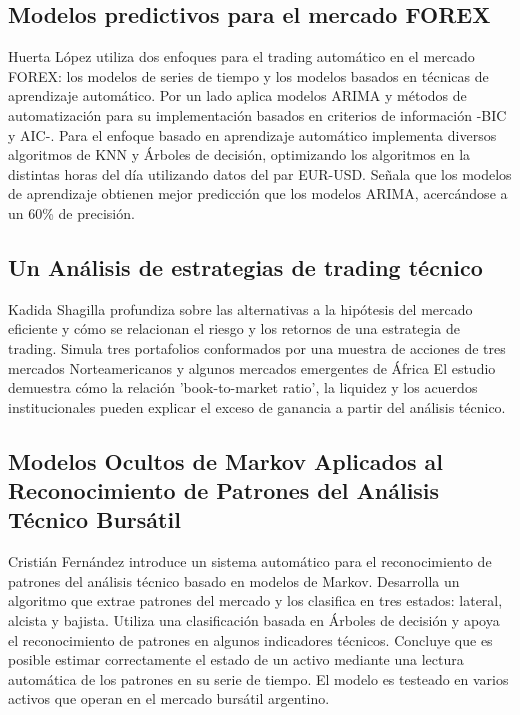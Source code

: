 \documentclass[a4paper,12pt]{Latex/Classes/PhDthesisPSnPDF}
\begin{document}
\subsection{Modelos predictivos para el mercado FOREX}

Huerta López utiliza dos enfoques para el trading automático en el mercado FOREX: los modelos de series de tiempo y los modelos basados en técnicas de aprendizaje automático. Por un lado aplica modelos ARIMA y métodos de automatización para su implementación basados en criterios de información -BIC y AIC-. Para el enfoque basado en aprendizaje automático implementa diversos algoritmos de KNN y Árboles de decisión, optimizando los algoritmos en la distintas horas del día utilizando datos del par EUR-USD. Señala que los modelos de aprendizaje obtienen mejor predicción que los modelos ARIMA, acercándose a un 60\% de precisión.

\subsection{Un Análisis de estrategias de trading técnico}

Kadida Shagilla profundiza sobre las alternativas a la hipótesis del mercado eficiente y cómo se relacionan el riesgo y los retornos de una estrategia de trading. Simula tres portafolios conformados por una muestra de acciones de tres mercados Norteamericanos y algunos mercados emergentes de África El estudio demuestra cómo la relación 'book-to-market ratio', la liquidez y los acuerdos institucionales pueden explicar el exceso de ganancia a partir del análisis técnico. 

\subsection{Modelos Ocultos de Markov Aplicados al Reconocimiento de Patrones del Análisis Técnico Bursátil}

Cristián Fernández introduce un sistema automático para el reconocimiento de patrones del análisis técnico basado en modelos de Markov. Desarrolla un algoritmo que extrae patrones del mercado y los clasifica en tres estados: lateral, alcista y bajista. Utiliza una clasificación basada en Árboles de decisión y apoya el reconocimiento de patrones en algunos indicadores técnicos. Concluye que es posible estimar correctamente el estado de un activo mediante una lectura automática de los patrones en su serie de tiempo. El modelo es testeado en varios activos que operan en el mercado bursátil argentino.
\end{document}

